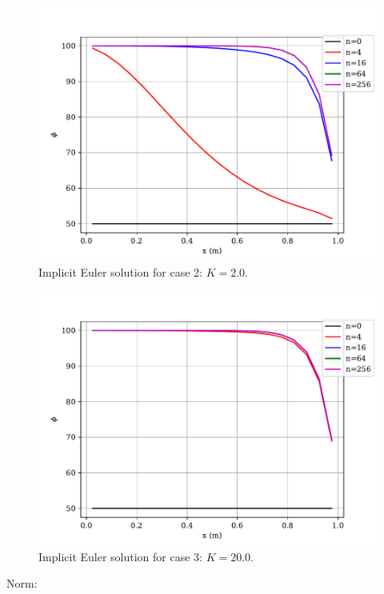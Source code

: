 \documentclass[12pt]{article}
\begin{document}
\begin{figure}[htbp]
    \centering
    \includegraphics[width=\textwidth]{plots/graph_IE_case2.pdf}
    \caption{Implicit Euler solution for case 2: $K=2.0$.}
\end{figure}

\begin{figure}[htbp]
    \centering
    \includegraphics[width=\textwidth]{plots/graph_IE_case3.pdf}
    \caption{Implicit Euler solution for case 3: $K=20.0$.}
\end{figure}


Norm:

\end{document}
